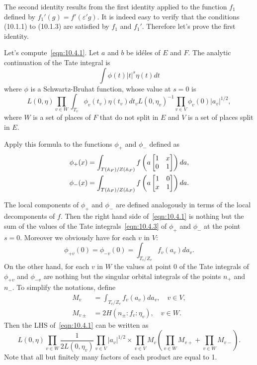The second identity results from the first identity applied to the function $f_1$ defined by $f_1'(g) = f'(\varepsilon' g)$.
It is indeed easy to verify that the conditions (10.1.1) to (10.1.3) are satisfied by $f_1$ and $f_1'$.
Therefore let's prove the first identity.

Let's compute~\eqref{eqn:10.4.1}.
Let $a$ and $b$ be id\'eles of $E$ and $F$.
The analytic continuation of the Tate integral is 
\begin{equation}\label{eqn:10.4.3}
    \int \phi(t) |t|^{s} \eta(t) dt
\end{equation}
where $\phi$ is a Schwartz-Bruhat function, whose value at $s=0$ is
\begin{equation*}
    L(0, \eta) \prod_{v\in W} \int_{T_v} \phi_v(t_v) \eta(t_v) dt_v L(0, \eta_v)^{-1} \prod_{v\in V} \phi_v(0) |a_v|^{1/2},
\end{equation*}
where $W$ is a set of places of $F$ that do not split in $E$ and $V$ is a set of places split in $E$.

Apply this formula to the functions $\phi_{+}$ and $\phi_{-}$ defined as
\begin{align*}
    \phi_{+}(x) &= \int_{T(\mathbb{A}_F) / Z(\mathbb{A}_F)} f\left(a \begin{bmatrix} 1 & x \\ 0 & 1 \end{bmatrix}\right) da, \\
    \phi_{-}(x) &= \int_{T(\mathbb{A}_F) / Z(\mathbb{A}_F)} f\left(a \begin{bmatrix} 1 & 0 \\ x & 1 \end{bmatrix}\right) da.
\end{align*}

The local components of $\phi_{+}$ and $\phi_{-}$ are defined analogously in terms of the local decomponents of $f$.
Then the right hand side of~\eqref{eqn:10.4.1} is nothing but the sum of the values of the Tate integrals~\eqref{eqn:10.4.3} of $\phi_{+}$ and $\phi_{-}$ at the point $s=0$.
Moreover we obviously have for each $v$ in $V$:
\begin{equation*}
    \phi_{+v}(0) = \phi_{-v}(0) = \int_{T_v/Z_v} f_v(a_v) da_v.
\end{equation*}
On the other hand, for each $v$ in $W$ the values at point 0 of the Tate integrals of $\phi_{+v}$ and $\phi_{-v}$ are nothing but the singular orbital integrals 
of the points $n_+$ and $n_-$.
To simplify the notations, define
\begin{align*}
    M_v &= \int_{T_v/Z_v} f_v(a_v) da_v, \quad v\in V, \\
    M_{v\pm} &= 2 H(n_{\pm}:f_v:\eta_v), \quad v\in W.
\end{align*}
Then the LHS of~\eqref{eqn:10.4.1} can be written as
\begin{equation}\label{eqn:10.4.4}
    L(0, \eta) \prod_{v\in W} \frac{1}{2L(0, \eta_v)} \prod_{v \in V}|a_v|^{1/2} \times \prod_{v\in V}M_v  \left(\prod_{v\in W}M_{v+} + \prod_{v\in W}M_{v-}\right).
\end{equation}
Note that all but finitely many factors of each product are equal to 1.

